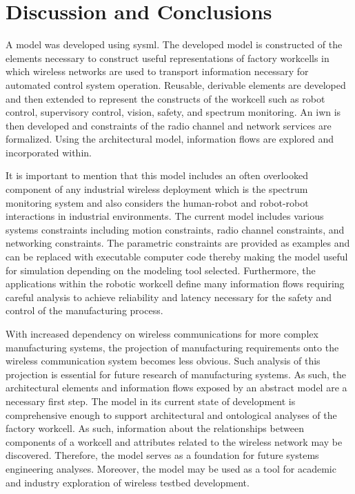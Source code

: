 \section{Discussion and Conclusions}\label{sysml:sec:conclusion}
A model was developed using \gls{sysml}. The developed model is constructed of the elements necessary to construct useful representations of factory workcells in which wireless networks are used to transport information necessary for automated control system operation.  Reusable, derivable elements are developed and then extended to represent the constructs of the workcell such as robot control, supervisory control, vision, safety, and spectrum monitoring.  An \gls{iwn} is then developed and constraints of the radio channel and network services are formalized. Using the architectural model, information flows are explored and incorporated within. 

It is important to mention that this model includes an often overlooked component of any industrial wireless deployment which is the spectrum monitoring system and also considers the human-robot and robot-robot interactions in industrial environments. The current model includes various systems constraints including motion constraints, radio channel constraints, and networking constraints. The parametric constraints are provided as examples and can be replaced with executable computer code thereby making the model useful for simulation depending on the modeling tool selected. Furthermore, the applications within the robotic workcell define many information flows requiring careful analysis to achieve reliability and latency necessary for the safety and control of the manufacturing process.

With increased dependency on wireless communications for more complex manufacturing systems, the projection of manufacturing requirements onto the wireless communication system becomes less obvious. Such analysis of this projection is essential for future research of manufacturing systems. As such, the architectural elements and information flows exposed by an abstract model
are a necessary first step. The model in its current state of development is comprehensive enough to support architectural and ontological analyses of the factory workcell.  As such, information about the relationships between components of a workcell and attributes related to the wireless network may be discovered. Therefore, the model serves as a foundation for future systems engineering analyses. Moreover, the model may be used as a tool for academic and industry exploration of wireless testbed development.

%
%
